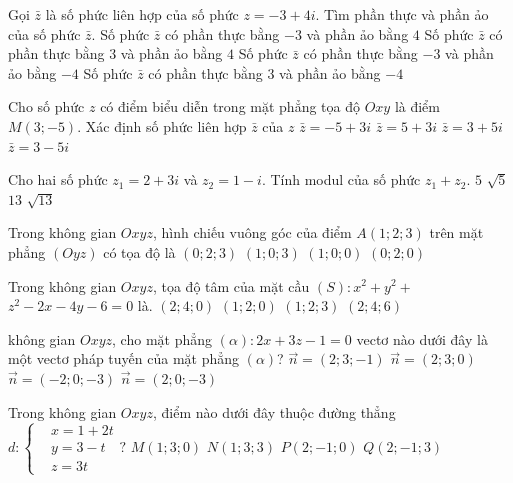 \begin{ex}%
Gọi $\bar{z}$ là số phức liên hợp của số phức $z=-3+4 i$. Tìm phần thực và phần ảo của số phức $\bar{z}$.
\choice
{Số phức $\bar{z}$ có phần thực bằng $-3$ và phần ảo bằng $4$}
{Số phức $\bar{z}$ có phần thực bằng $3$ và phần ảo bằng $4$}
{\True Số phức $\bar{z}$ có phần thực bằng $-3$ và phần ảo bằng $-4$}
{Số phức $\bar{z}$ có phần thực bằng $3$ và phần ảo bằng $-4$}

\end{ex}
\begin{ex}%
Cho số phức $z$ có điểm biểu diễn trong mặt phẳng tọa độ $O x y$ là điểm $M(3;-5)$. Xác định số phức liên hợp $\bar{z}$ của $z$ 
\choice
{$\bar{z}=-5+3 i$}
{\True $\bar{z}=5+3 i$}
{$\bar{z}=3+5 i$}
{$\bar{z}=3-5 i$}

\end{ex}
\begin{ex}%
Cho hai số phức $z_1=2+3 i$ và $z_2=1-i$. Tính modul của số phức $z_1+z_2$.
\choice
{$5$}
{$\sqrt{5}$}
{$13$}
{\True $\sqrt{13}$}

\end{ex}
\begin{ex}%
Trong không gian $O x y z$, hình chiếu vuông góc của điểm $A(1; 2; 3)$ trên mặt phẳng $(O y z)$ có tọa độ là
\choice
{\True $(0; 2; 3)$}
{$(1; 0; 3)$}
{$(1; 0; 0)$}
{$(0; 2; 0)$}

\end{ex}
\begin{ex}%
Trong không gian $O x y z$, tọa độ tâm của mặt cầu $(S)\colon x^2+y^2+$ $z^2-2 x-4 y-6=0$ là.
\choice
{$(2; 4; 0)$}
{\True $(1; 2; 0)$}
{$(1; 2; 3)$}
{$(2; 4; 6)$}

\end{ex}
\begin{ex}%
không gian $O x y z$, cho mặt phẳng $(\alpha)\colon 2 x+3 z-1=0$ vectơ nào dưới đây là một vectơ pháp tuyến của mặt phẳng $(\alpha)$?
\choice
{$\vec{n}=(2; 3;-1)$}
{$\vec{n}=(2; 3; 0)$}
{\True $\vec{n}=(-2; 0;-3)$}
{$\vec{n}=(2; 0;-3)$}

\end{ex}
\begin{ex}%
Trong không gian $O x y z$, điểm nào dưới đây thuộc đường thẳng $d\colon\left\{\begin{aligned}&x=1+2 t \\& y=3-t \\& z=3 t\end{aligned}?\right.$ 
\choice
{\True $M(1; 3; 0)$}
{$N(1; 3; 3)$}
{$P(2;-1; 0)$}
{$Q(2;-1; 3)$}

\end{ex}
